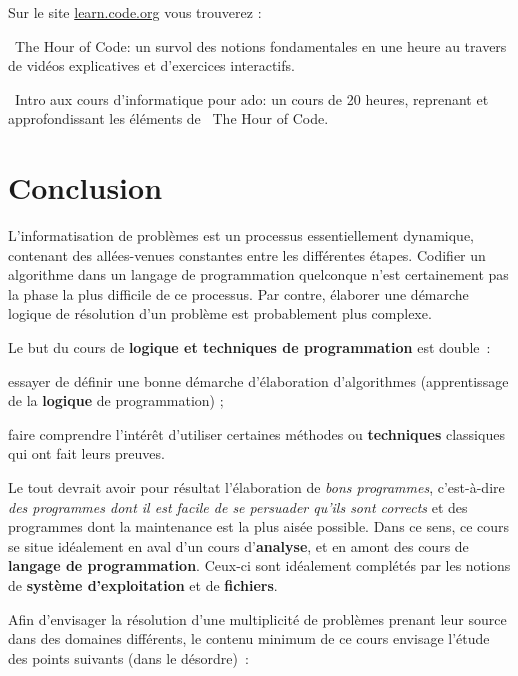 	Sur le site \url{learn.code.org} vous trouverez :
	\begin{liste}
	\item
		\og\ The Hour of Code\fg : 
		un survol des notions fondamentales en une heure
		au travers de vidéos explicatives
		et d'exercices interactifs.
	\item
		\og\ Intro aux cours d'informatique pour ado\fg : 
		un cours de 20 heures, 
		reprenant et approfondissant les éléments
		de \og\ The Hour of Code\fg.
	\end{liste}
	
	
\section{Conclusion}

	L’informatisation de problèmes est un processus essentiellement
	dynamique, contenant des allées-venues constantes entre les différentes
	étapes. Codifier un algorithme dans un langage de programmation
	quelconque n’est certainement pas la phase la plus difficile de ce
	processus. Par contre, élaborer une démarche logique de résolution d’un
	problème est probablement plus complexe.
	
	Le but du cours de \textbf{logique et techniques de programmation} est
	double~:

	\begin{liste}
	\item
		essayer de définir une bonne démarche d’élaboration d’algorithmes
		(apprentissage de la \textbf{logique} de programmation) ;
	\item
		faire comprendre l’intérêt d’utiliser certaines méthodes ou
		\textbf{techniques} classiques qui ont fait leurs preuves.
	\end{liste}

	Le tout devrait avoir pour résultat l’élaboration de \textit{bons
	programmes}, c’est-à-dire \textit{des programmes dont il est facile de
	se persuader qu’ils sont corrects} et des programmes dont la
	maintenance est la plus aisée possible. Dans ce sens, ce cours se situe
	idéalement en aval d’un cours d’\textbf{analyse}, et en amont des cours
	de \textbf{langage de programmation}. Ceux-ci sont idéalement complétés
	par les notions de \textbf{système d’exploitation} et de
	\textbf{fichiers}.

	Afin d’envisager la résolution d’une multiplicité de problèmes prenant
	leur source dans des domaines différents, le contenu minimum de ce
	cours envisage l’étude des points suivants (dans le désordre)~:

